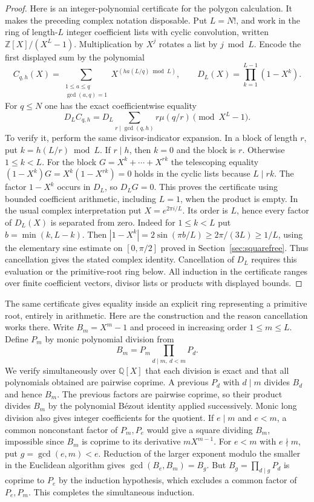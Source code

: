 \begin{proof}
Here is an integer-polynomial certificate for the polygon calculation.
It makes the preceding complex notation disposable. Put $L=N!$, and work
in the ring of length-$L$ integer coefficient lists with cyclic convolution,
written $\mathbb Z[X]/(X^L-1)$. Multiplication by $X^j$ rotates a list
by $j\bmod L$. Encode the first displayed sum by the polynomial
\[
 C_{q,h}(X)=\sum_{\substack{1\le a\le q\\\gcd(a,q)=1}}
    X^{(ha(L/q)\bmod L)},\qquad
 D_L(X)=\prod_{k=1}^{L-1}(1-X^k).
\]
For $q\le N$ one has the exact coefficientwise equality
\[
 D_L C_{q,h}=D_L\sum_{r\mid\gcd(q,h)}r\mu(q/r)
       \pmod{X^L-1}.
\]
To verify it, perform the same divisor-indicator expansion. In a block
of length $r$, put $k=h(L/r)\bmod L$. If $r\mid h$, then $k=0$ and the
block is $r$. Otherwise $1\le k<L$. For the block
$G=X^k+\cdots+X^{rk}$ the telescoping equality
$(1-X^k)G=X^k(1-X^{rk})=0$ holds in the cyclic lists because $L\mid rk$.
The factor $1-X^k$ occurs in $D_L$, so $D_L G=0$. This proves the
certificate using bounded coefficient arithmetic, including $L=1$, when
the product is empty. In the usual complex interpretation put
$X=e^{2\pi i/L}$. Its order is $L$, hence every factor of $D_L(X)$ is
separated from zero. Indeed for $1\le k<L$ put $b=\min(k,L-k)$.
Then $|1-X^k|=2\sin(\pi b/L)\ge2\pi/(3L)\ge1/L$, using the elementary
sine estimate on $[0,\pi/2]$ proved in Section~\ref{sec:squarefree}.
Thus cancellation gives the stated complex identity. Cancellation of
$D_L$ requires this evaluation or the primitive-root ring below. All induction in
the certificate ranges over finite coefficient vectors, divisor lists or
products with displayed bounds.
\end{proof}

The same certificate gives equality inside an explicit ring representing a
primitive root, entirely in arithmetic. Here are the construction and the
reason cancellation works there. Write $B_m=X^m-1$ and proceed in increasing
order $1\le m\le L$. Define $P_m$ by monic polynomial division from
\[
 B_m=P_m\prod_{d\mid m,\ d<m}P_d.
\]
We verify simultaneously over $\mathbb Q[X]$ that each division is exact
and that all polynomials obtained are pairwise coprime. A previous
$P_d$ with $d\mid m$ divides $B_d$ and hence $B_m$. The previous factors
are pairwise coprime, so their product divides $B_m$ by the polynomial
B\'ezout identity applied successively. Monic long division also gives
integer coefficients for the quotient. If $e\mid m$ and $e<m$, a common
nonconstant factor of $P_m,P_e$ would give a square dividing $B_m$,
impossible since $B_m$ is coprime to its derivative $mX^{m-1}$.
For $e<m$ with $e\nmid m$, put $g=\gcd(e,m)<e$. Reduction of the larger
exponent modulo the smaller in the Euclidean algorithm gives
$\gcd(B_e,B_m)=B_g$. But $B_g=\prod_{d\mid g}P_d$ is coprime to $P_e$
by the induction hypothesis, which excludes a common factor of $P_e,P_m$.
This completes the simultaneous induction.

